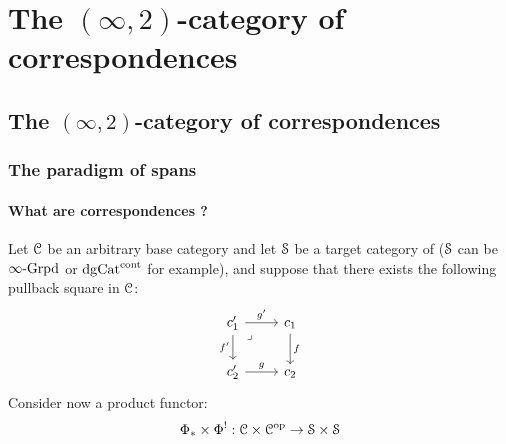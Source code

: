 \chapter{The \texorpdfstring{$(\infty, 2)$}{}-category of correspondences}
    \begin{abstract}
        
    \end{abstract}
    
    \minitoc

    \section{The \texorpdfstring{$(\infty, 2)$}{}-category of correspondences}
        \subsection{The paradigm of spans} \label{subsection: spans}
            \subsubsection{What are correspondences ?}
                \begin{remark} \label{remark: why_correspondences}
                    Let $\C$ be an arbitrary base category and let $\S$ be a target category of  ($\S$ can be $\infty\-\Grpd$ or $\dg\Cat^{\cont}$ for example), and suppose that there exists the following pullback square in $\C$:
                        $$
                            \begin{tikzcd}
                            	{c_1'} & {c_1} \\
                            	{c_2'} & {c_2}
                            	\arrow["f", from=1-2, to=2-2]
                            	\arrow["g", from=2-1, to=2-2]
                            	\arrow["{f'}"', from=1-1, to=2-1]
                            	\arrow["{g'}", from=1-1, to=1-2]
                            	\arrow["\lrcorner"{anchor=center, pos=0.125}, draw=none, from=1-1, to=2-2]
                            \end{tikzcd}
                        $$
                    Consider now a product functor:
                        $$\Phi_* \x \Phi^!: \C \x \C^{\op} \to \S \x \S$$
                    
                \end{remark}
            
